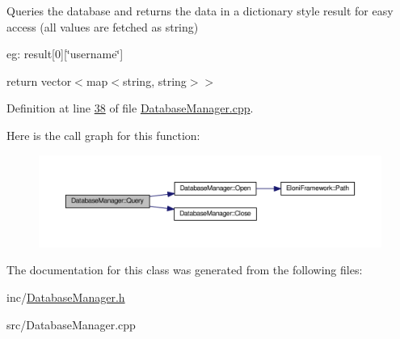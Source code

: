 Queries the database and returns the data in a dictionary style result for easy access (all values are fetched as string) 

eg\-: result\mbox{[}0\mbox{]}\mbox{[}\char`\"{}username\char`\"{}\mbox{]}

return vector$<$map$<$string, string$>$$>$ 

Definition at line \hyperlink{DatabaseManager_8cpp_source_l00038}{38} of file \hyperlink{DatabaseManager_8cpp_source}{Database\-Manager.\-cpp}.



Here is the call graph for this function\-:
\nopagebreak
\begin{figure}[H]
\begin{center}
\leavevmode
\includegraphics[width=350pt]{classDatabaseManager_adefb1bdb51d7b23d4b3a446a3f22ea26_cgraph}
\end{center}
\end{figure}




The documentation for this class was generated from the following files\-:\begin{DoxyCompactItemize}
\item 
inc/\hyperlink{DatabaseManager_8h}{Database\-Manager.\-h}\item 
src/Database\-Manager.\-cpp\end{DoxyCompactItemize}
